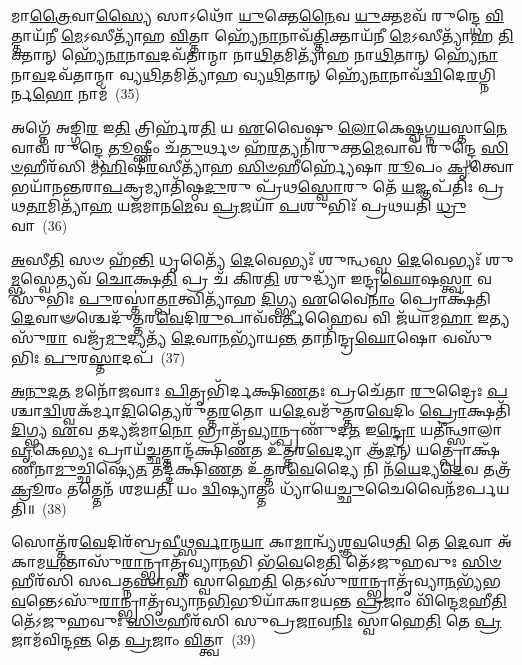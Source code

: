 𑌮𑌾\-\ul{𑌤𑍍𑌰𑍈}\-𑌵𑌾\-\ul{𑌸𑍍𑌯𑍈} 𑌸𑌾\-𑌽𑌥𑍋᳴ \ul{𑌯𑍁}\-𑌕𑍍𑌤𑍇\-\ul{𑌨𑍈}\-𑌵 \ul{𑌯𑍁}\-𑌕𑍍𑌤𑌮𑌵᳴ 𑌰𑍁𑌨𑍍𑌦𑍍𑌧𑍇 \ul{𑌵𑌿}\-𑌤𑍍𑌤𑌾𑌯᳴𑌨𑍀 \ul{𑌮𑍇}\-\-𑌽𑌸𑍀𑌤𑍍𑌯𑌾᳴𑌹 \ul{𑌵𑌿}\-𑌤𑍍𑌤𑌾 𑌹𑍍𑌯𑍇᳴\-\ul{𑌨𑌾}\-𑌨𑌾𑌵᳴\-\ul{𑌤𑍍𑌤𑌿}\-𑌕𑍍𑌤𑌾𑌯᳴𑌨𑍀 \ul{𑌮𑍇}\-\-𑌽𑌸𑍀𑌤𑍍𑌯𑌾᳴𑌹 \ul{𑌤𑌿}\-𑌕𑍍𑌤𑌾𑌨𑍍 𑌹𑍍𑌯𑍇᳴\-\ul{𑌨𑌾}\-𑌨𑌾\-\ul{𑌵}\-𑌦𑌵᳴𑌤𑌾𑌨𑍍𑌮𑌾 𑌨𑌾\-\ul{𑌥𑌿}\-𑌤𑌮𑌿𑌤𑍍𑌯𑌾᳴𑌹 𑌨𑌾\-\ul{𑌥𑌿}\-𑌤𑌾𑌨𑍍 𑌹𑍍𑌯𑍇᳴\-\ul{𑌨𑌾}\-𑌨𑌾\-\ul{𑌵}\-𑌦𑌵᳴𑌤𑌾𑌨𑍍𑌮𑌾 𑌵𑍍𑌯\-\ul{𑌥𑌿}\-𑌤𑌮𑌿𑌤𑍍𑌯𑌾᳴𑌹 𑌵𑍍𑌯\-\ul{𑌥𑌿}\-𑌤𑌾𑌨𑍍 𑌹𑍍𑌯𑍇᳴\-\ul{𑌨𑌾}\-𑌨𑌾𑌵᳴\-\ul{𑌦𑍍𑌵𑌿}\-𑌦𑍇\-\ul{𑌰}\-𑌗𑍍𑌨𑌿𑌰𑍍𑌨\-\ul{𑌭𑍋} 𑌨𑌾𑌮᳴~(35)

𑌅𑌗𑍍𑌨𑍇᳴ 𑌅𑌙𑍍𑌗𑌿\-\ul{𑌰} 𑌇\-\ul{𑌤𑌿} 𑌤𑍍𑌰𑌿𑌰𑍍\mbox{}𑌹᳴𑌰\-\ul{𑌤𑌿} 𑌯 \ul{𑌏}\-𑌵𑍈𑌷𑍁 \ul{𑌲𑍋}\-𑌕𑍇\-\ul{𑌷𑍍𑌵}\-𑌗𑍍𑌨\-\ul{𑌯}\-𑌸𑍍𑌤𑌾\-\ul{𑌨𑍇}\-𑌵𑌾𑌵᳴ 𑌰𑍁𑌨𑍍𑌦𑍍𑌧𑍇 \ul{𑌤𑍂}\-𑌷𑍍𑌣𑍀𑌂 𑌚᳴\-\ul{𑌤𑍁}\-𑌰𑍍𑌥𑍞 𑌹᳴\-\ul{𑌰}\-𑌤𑍍𑌯𑌨𑌿᳴𑌰𑍁𑌕𑍍𑌤\-\ul{𑌮𑍇}\-𑌵𑌾𑌵᳴ 𑌰𑍁𑌨𑍍𑌦𑍍𑌧𑍇 \ul{𑌸𑌿}\-\-\ul{𑍞}\-𑌹𑍀𑌰᳴𑌸𑌿 𑌮\-\ul{𑌹𑌿}\-𑌷𑍀\-\ul{𑌰}\-𑌸𑍀𑌤𑍍𑌯𑌾᳴𑌹 \ul{𑌸𑌿}\-\-\ul{𑍞}\-𑌹𑍀𑌰𑍍\mbox{}𑌹𑍍𑌯𑍇᳴𑌷𑌾 \ul{𑌰𑍂}\-𑌪𑌂 \ul{𑌕𑍃}\-𑌤𑍍𑌵𑍋𑌭𑌯𑌾᳴𑌨\-\ul{𑌨𑍍𑌤}\-𑌰𑌾\-\ul{𑌪}\-𑌕𑍍𑌰𑌮𑍍𑌯𑌾𑌤𑌿᳴𑌷𑍍𑌠\-\ul{𑌦𑍁}\-𑌰𑍁 𑌪𑍍𑌰᳴𑌥\-\ul{𑌸𑍍𑌵𑍋}\-𑌰𑍁 𑌤𑍇᳴ \ul{𑌯}\-𑌜𑍍𑌞𑌪᳴𑌤𑌿𑌃 𑌪𑍍𑌰𑌥\-\ul{𑌤𑌾}\-𑌮𑌿𑌤𑍍𑌯𑌾᳴\-\ul{𑌹} 𑌯𑌜᳴𑌮𑌾𑌨\-\ul{𑌮𑍇}\-𑌵 \ul{𑌪𑍍𑌰}\-𑌜𑌯𑌾᳴ \ul{𑌪}\-𑌶𑍁𑌭𑌿𑌃᳴ 𑌪𑍍𑌰𑌥𑌯𑌤𑌿 \ul{𑌧𑍍𑌰𑍁}\-𑌵𑌾~(36)

\-\ul{𑌅}\-𑌸𑍀\-\ul{𑌤𑌿} 𑌸𑍞 𑌹᳴\-\ul{𑌨𑍍𑌤𑌿} 𑌧𑍃𑌤𑍍𑌯𑍈᳴ \ul{𑌦𑍇}\-𑌵𑍇𑌭𑍍𑌯𑌃᳴ 𑌶𑍁𑌨𑍍𑌧𑌸𑍍𑌵 \ul{𑌦𑍇}\-𑌵𑍇𑌭𑍍𑌯𑌃᳴ 𑌶𑍁\-\ul{𑌮𑍍𑌭}\-𑌸𑍍𑌵𑍇𑌤𑍍𑌯𑌵᳴ \ul{𑌚𑍋}\-𑌕𑍍𑌷\-\ul{𑌤𑌿} 𑌪𑍍𑌰 𑌚᳴ 𑌕𑌿𑌰\-\ul{𑌤𑌿} 𑌶𑍁𑌦𑍍𑌧𑍍𑌯𑌾᳴ 𑌇𑌨𑍍𑌦𑍍𑌰\-\ul{𑌘𑍋}\-𑌷\-\ul{𑌸𑍍𑌤𑍍𑌵𑌾} 𑌵𑌸𑍁᳴𑌭𑌿𑌃 \ul{𑌪𑍁}\-𑌰𑌸𑍍𑌤𑌾॑\-\ul{𑌤𑍍𑌪𑌾}\-𑌤𑍍𑌵𑌿𑌤𑍍𑌯𑌾᳴𑌹 \ul{𑌦𑌿}\-𑌗𑍍𑌭𑍍𑌯 \ul{𑌏}\-𑌵𑍈\-\ul{𑌨𑌾𑌂} 𑌪𑍍𑌰𑍋𑌕𑍍𑌷᳴𑌤𑌿 \ul{𑌦𑍇}\-𑌵𑌾𑍟𑌶𑍍𑌚𑍇𑌦𑍁᳴𑌤𑍍𑌤𑌰\-\ul{𑌵𑍇}\-𑌦𑌿\-\ul{𑌰𑍁}\-𑌪𑌾𑌵᳴𑌵\-\ul{𑌰𑍍𑌤𑍀}\-𑌹𑍈𑌵 𑌵𑌿 𑌜᳴𑌯𑌾𑌮\-\ul{𑌹𑌾} 𑌇𑌤𑍍𑌯𑌸𑍁᳴\-\ul{𑌰𑌾} 𑌵𑌜𑍍𑌰᳴\-\ul{𑌮𑍁}\-𑌦𑍍𑌯𑌤𑍍𑌯᳴ \ul{𑌦𑍇}\-𑌵𑌾\-\ul{𑌨}\-𑌭𑍍𑌯𑌾᳴𑌯\-\ul{𑌨𑍍𑌤} 𑌤𑌾𑌨𑌿᳴𑌨𑍍𑌦𑍍𑌰\-\ul{𑌘𑍋}\-𑌷𑍋 𑌵𑌸𑍁᳴𑌭𑌿𑌃 \ul{𑌪𑍁}\-𑌰\-\ul{𑌸𑍍𑌤𑌾}\-𑌦𑌪᳴~(37)

\-\ul{𑌅}\-\-\ul{𑌨𑍁}\-\-\ul{𑌦}\-\-\ul{𑌤} 𑌮𑌨𑍋᳴𑌜𑌵𑌾𑌃 \ul{𑌪𑌿}\-𑌤𑍃𑌭𑌿᳴𑌰𑍍𑌦𑌕𑍍𑌷𑌿\-\ul{𑌣}\-𑌤𑌃 𑌪𑍍𑌰𑌚𑍇᳴𑌤𑌾 \ul{𑌰𑍁}\-𑌦𑍍𑌰𑍈𑌃 \ul{𑌪}\-𑌶𑍍𑌚𑌾\-\ul{𑌦𑍍𑌵𑌿}\-𑌶𑍍𑌵𑌕᳴𑌰𑍍𑌮𑌾\-\ul{𑌦𑌿}\-𑌤𑍍𑌯𑍈𑌰𑍁᳴𑌤𑍍𑌤\-\ul{𑌰}\-𑌤𑍋 𑌯\-\ul{𑌦𑍇}\-𑌵𑌮𑍁᳴𑌤𑍍𑌤𑌰\-\ul{𑌵𑍇}\-𑌦𑌿𑌂 \ul{𑌪𑍍𑌰𑍋}\-𑌕𑍍𑌷𑌤𑌿᳴ \ul{𑌦𑌿}\-𑌗𑍍𑌭𑍍𑌯 \ul{𑌏}\-𑌵 𑌤𑌦𑍍𑌯𑌜᳴𑌮𑌾\-\ul{𑌨𑍋} 𑌭𑍍𑌰𑌾𑌤𑍃᳴\-\ul{𑌵𑍍𑌯𑌾}\-𑌨𑍍𑌪𑍍𑌰𑌣𑍁᳴𑌦\-\ul{𑌤} 𑌇\-\ul{𑌨𑍍𑌦𑍍𑌰𑍋} 𑌯𑌤𑍀॑𑌨𑍍𑌥𑍍𑌸𑌾𑌲𑌾\-\ul{𑌵𑍃}\-𑌕𑍇\-\ul{𑌭𑍍𑌯𑌃} 𑌪𑍍𑌰𑌾𑌯᳴\-\ul{𑌚𑍍𑌛}\-𑌤𑍍𑌤𑌾𑌨𑍍𑌦᳴𑌕𑍍𑌷𑌿\-\ul{𑌣}\-𑌤 𑌉᳴𑌤𑍍𑌤𑌰\-\ul{𑌵𑍇}\-𑌦𑍍𑌯𑌾 𑌆᳴\-\ul{𑌦}\-𑌨𑍍 𑌯𑌤𑍍𑌪𑍍𑌰𑍋𑌕𑍍𑌷᳴𑌣𑍀𑌨𑌾\-\ul{𑌮𑍁}\-𑌚𑍍𑌛𑌿𑌷𑍍𑌯𑍇᳴\-\ul{𑌤} 𑌤𑌦𑍍𑌦᳴𑌕𑍍𑌷𑌿\-\ul{𑌣}\-𑌤 𑌉᳴𑌤𑍍𑌤𑌰\-\ul{𑌵𑍇}\-𑌦𑍍𑌯𑍈 𑌨𑌿 𑌨᳴\-\ul{𑌯𑍇}\-𑌦𑍍𑌯\-\ul{𑌦𑍇}\-𑌵 𑌤𑌤𑍍𑌰᳴ \ul{𑌕𑍍𑌰𑍂}\-𑌰𑌂 𑌤𑌤𑍍𑌤𑍇𑌨᳴ 𑌶𑌮𑌯\-\ul{𑌤𑌿} 𑌯𑌂 \ul{𑌦𑍍𑌵𑌿}\-𑌷𑍍𑌯𑌾𑌤𑍍𑌤𑌂 𑌧𑍍𑌯𑌾᳴𑌯𑍇\-\ul{𑌚𑍍𑌛𑍁}\-𑌚𑍈𑌵𑍈𑌨᳴𑌮𑌰𑍍𑌪𑌯𑌤𑌿॥~(38)

{\anuvakamend[{\-\ul{𑌮𑌿}\-\-\ul{𑌮𑍀}\-\-\ul{𑌤𑍇} 𑌨𑌾𑌮᳴ \ul{𑌧𑍍𑌰𑍁}\-𑌵𑌾\-𑌽𑌪᳴ \ul{𑌶𑍁}\-𑌚𑌾 𑌤𑍍𑌰𑍀𑌣𑌿᳴ 𑌚}]}%

𑌸𑍋𑌤𑍍𑌤᳴𑌰\-\ul{𑌵𑍇}\-𑌦𑌿𑌰᳴𑌬𑍍𑌰\-\ul{𑌵𑍀}\-𑌥𑍍𑌸\-\ul{𑌰𑍍𑌵𑌾}\-𑌨𑍍𑌮\-\ul{𑌯𑌾} 𑌕𑌾\-\ul{𑌮𑌾}\-𑌨𑍍𑌵𑍍𑌯᳴𑌶𑍍𑌞\-\ul{𑌵}\-𑌥𑍇\-\ul{𑌤𑌿} 𑌤𑍇 \ul{𑌦𑍇}\-𑌵𑌾 𑌅᳴𑌕𑌾𑌮\-\ul{𑌯}\-𑌨𑍍𑌤𑌾𑌸𑍁᳴\-\ul{𑌰𑌾}\-𑌨𑍍𑌭𑍍𑌰𑌾𑌤𑍃᳴𑌵𑍍𑌯𑌾\-\ul{𑌨}\-𑌭𑌿 𑌭᳴\-\ul{𑌵𑍇}\-𑌮𑍇\-\ul{𑌤𑌿} 𑌤𑍇᳴\-𑌽𑌜𑍁𑌹𑌵𑍁𑌃 \ul{𑌸𑌿}\-\-\ul{𑍞}\-𑌹𑍀𑌰᳴𑌸𑌿 𑌸𑌪𑌤𑍍𑌨\-\ul{𑌸𑌾}\-𑌹𑍀 𑌸𑍍𑌵𑌾𑌹𑍇\-\ul{𑌤𑌿} 𑌤𑍇\-𑌽𑌸𑍁᳴\-\ul{𑌰𑌾}\-𑌨𑍍𑌭𑍍𑌰𑌾𑌤𑍃᳴𑌵𑍍𑌯𑌾\-\ul{𑌨}\-𑌭𑍍𑌯᳴𑌭\-\ul{𑌵}\-𑌨𑍍𑌤𑍇\-𑌽𑌸𑍁᳴\-\ul{𑌰𑌾}\-𑌨𑍍𑌭𑍍𑌰𑌾𑌤𑍃᳴𑌵𑍍𑌯𑌾𑌨\-\ul{𑌭𑌿}\-𑌭𑍂𑌯𑌾᳴𑌕𑌾𑌮𑌯𑌨𑍍𑌤 \ul{𑌪𑍍𑌰}\-𑌜𑌾𑌂 𑌵𑌿᳴𑌨𑍍𑌦𑍇\-\ul{𑌮}\-𑌹𑍀\-\ul{𑌤𑌿} 𑌤𑍇᳴\-𑌽𑌜𑍁𑌹𑌵𑍁𑌃 \ul{𑌸𑌿}\-\-\ul{𑍞}\-𑌹𑍀𑌰᳴𑌸𑌿 𑌸𑍁𑌪𑍍𑌰\-\ul{𑌜𑌾}\-𑌵\-\ul{𑌨𑌿𑌃} 𑌸𑍍𑌵𑌾𑌹𑍇\-\ul{𑌤𑌿} 𑌤𑍇 \ul{𑌪𑍍𑌰}\-𑌜𑌾𑌮᳴𑌵𑌿𑌨𑍍𑌦\-\ul{𑌨𑍍𑌤} 𑌤𑍇 \ul{𑌪𑍍𑌰}\-𑌜𑌾𑌂 \ul{𑌵𑌿}\-𑌤𑍍𑌤𑍍𑌵𑌾~(39)

